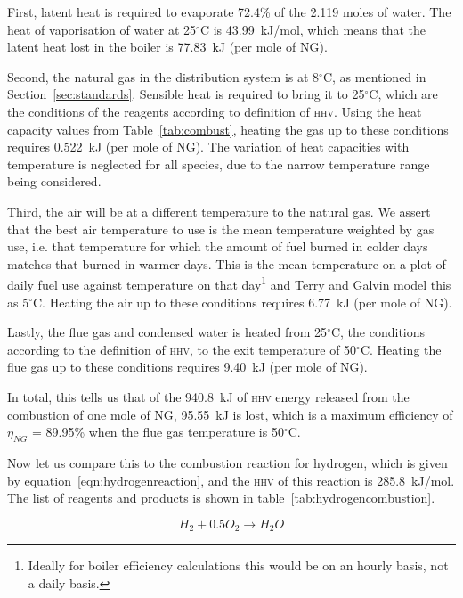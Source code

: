 \documentclass[5p]{elsarticle} %
\begin{document}
First, latent heat is required to evaporate 72.4\% of the 2.119 moles of water.
The heat of vaporisation of water at 25$^{\circ}$C is 43.99~kJ/mol, which means that the latent heat lost in the boiler is 77.83~kJ (per mole of NG).

Second, the natural gas in the distribution system is at 8$^{\circ}$C, as mentioned in Section~\ref{sec:standards}. 
Sensible heat is required to bring it to 25$^{\circ}$C, which are the conditions of the reagents according to definition of \textsc{hhv}.
Using the heat capacity values from Table~\ref{tab:combust}, heating the gas up to these conditions requires 0.522~kJ (per mole of NG).
The variation of heat capacities with temperature is neglected for all species, due to the narrow temperature range being considered.

Third, the air will be at a different temperature to the natural gas. 
We assert that the best air temperature to use is the mean temperature weighted by gas use, i.e. that temperature for which the amount of fuel burned in colder days matches that burned in warmer days. 
This is the mean temperature on a plot of daily fuel use against temperature on that day\footnote{Ideally for boiler efficiency calculations this would be on an hourly basis, not a daily basis.} and Terry and Galvin\citep{Terry2023} model this as 5$^\circ$C.
Heating the air up to these conditions requires 6.77~kJ (per mole of NG).

Lastly, the flue gas and condensed water is heated from 25$^\circ$C, the conditions 
according to the definition of \textsc{hhv}, to the exit temperature of 50$^{\circ}$C.
Heating the flue gas up to these conditions requires 9.40~kJ (per mole of NG).

In total, this tells us that of the 940.8~kJ of \textsc{hhv} energy released from the combustion of one mole of NG, 95.55~kJ is lost, which is a maximum efficiency of $\eta_{NG}$ = 89.95\% when the flue gas temperature is 50$^{\circ}$C.

Now let us compare this to the combustion reaction for hydrogen, which is given by equation~\eqref{eqn:hydrogenreaction}, and the \textsc{hhv} of this reaction is 285.8~kJ/mol.
The list of reagents and products is shown in table~\ref{tab:hydrogencombustion}.

\begin{equation}
    \label{eqn:hydrogenreaction}
    H_2 + 0.5 O_2 \longrightarrow H_2 O
\end{equation}
\end{document}
